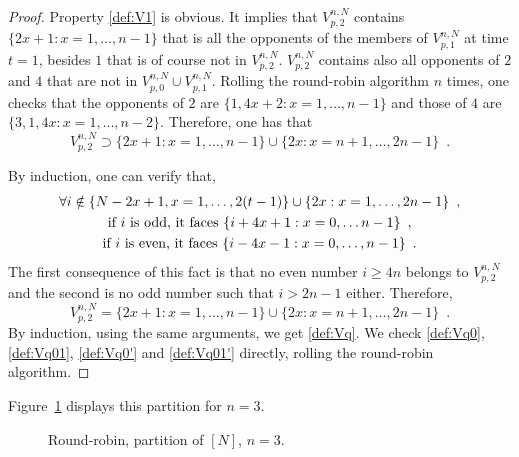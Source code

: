 \begin{proof}
Property \eqref{def:V1} is obvious. It implies that $V_{p,2}^{n,N}$ contains $\{2x+1 : x=1,\ldots,n-1\}$ that is all the opponents of the members of $V_{p,1}^{n,N}$ at time $t=1$, besides $1$ that is of course not in $V_{p,2}^{n,N}$. $V_{p,2}^{n,N}$ contains also all opponents of $2$ and $4$ that are not in $V_{p,0}^{n,N}\cup V_{p,1}^{n,N}$. Rolling the round-robin algorithm $n$ times, one checks that the opponents of $2$ are $\{1,4x+2 : x=1,\ldots,n-1\}$ and those of $4$ are $\{3,1,4x : x=1,\ldots,n-2\}$. Therefore, one has that 
\[
V_{p,2}^{n,N}\supset \{2x+1 : x=1,\ldots,n-1\}\cup\{2x : x=n+1,\ldots,2n-1\}\enspace.
\]

By induction, one can verify that, 
\begin{gather}
\notag\forall i\notin \{N-2x+1, x=1,\ldots,2(t-1)\}\cup \{2x : x=1,\ldots, 2n-1\}\enspace,\\
\notag\text{if }i \text{ is odd, it faces }\{i+4x+1 : x=0,\ldots n-1\}\enspace,\\
\label{eq:Opponents}\text{if }i \text{ is even, it faces }\{i-4x-1 : x=0,\ldots,n-1\}\enspace.
\end{gather}
The first consequence of this fact is that no even number $i\ge 4n$ belongs to $V_{p,2}^{n,N}$ and the second is no odd number such that $i>2n-1$ either. Therefore,
\begin{equation*}
 V_{p,2}^{n,N}= \{2x+1 : x=1,\ldots,n-1\}\cup\{2x : x=n+1,\ldots,2n-1\}\enspace.
\end{equation*}
By induction, using the same arguments, we get \eqref{def:Vq}.
We check \eqref{def:Vq0}, \eqref{def:Vq01}, \eqref{def:Vq0'} and \eqref{def:Vq01'} directly, rolling the round-robin algorithm. 
\end{proof}
Figure~\ref{fig:robin:partitionP} displays this partition for $n = 3$.

\begin{figure}
\centering
{}
\caption{Round-robin, partition of $[N]$, $n=3$.}
\label{fig:robin:partitionP}
\end{figure}

